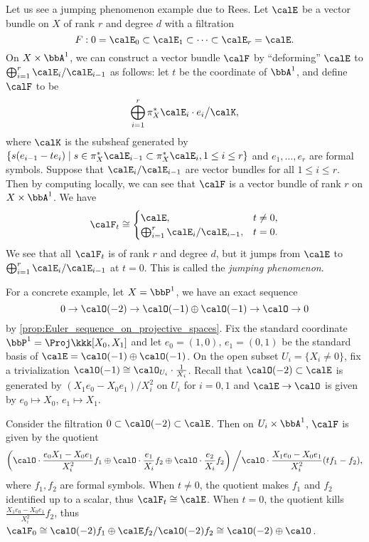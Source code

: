     Let us see a jumping phenomenon example due to Rees.
    Let \(\calE\) be a vector bundle on \(X\) of rank \(r\) and degree \(d\) with a filtration
    \[F: 0 = \calE_0 \subset \calE_1 \subset \cdots \subset \calE_r = \calE. \]
    On \(X \times \bbA^1\), we can construct a vector bundle \(\calF\) by ``deforming'' \(\calE\) to \(\bigoplus_{i=1}^r \calE_i/\calE_{i-1}\) as follows:
    let \(t\) be the coordinate of \(\bbA^1\), 
    and define \(\calF\) to be 
    \[ \bigoplus_{i=1}^r \pi_X^* \calE_i \cdot e_i \big/ \calK, \]
    where \(\calK\) is the subsheaf generated by \(\{s (e_{i-1} -te_i) \mid s \in \pi_X^* \calE_{i-1} \subset \pi_X^* \calE_i, 1 \leq i \leq r\}\) and \(e_1, \ldots, e_r\) are formal symbols.
    Suppose that \(\calE_i/\calE_{i-1}\) are vector bundles for all \(1 \leq i \leq r\).
    Then by computing locally, we can see that \(\calF\) is a vector bundle of rank \(r\) on \(X \times \bbA^1\).
    We have 
    \[ \calF_t \cong \begin{cases}
        \calE, & t \neq 0, \\
        \bigoplus_{i=1}^r \calE_i/\calE_{i-1}, & t = 0.
    \end{cases} \]
    We see that all \(\calF_t\) is of rank \(r\) and degree \(d\), but it jumps from \(\calE\) to \(\bigoplus_{i=1}^r \calE_i/\calE_{i-1}\) at \(t = 0\).
    This is called the \emph{jumping phenomenon}.

    \begin{example}\label{eg:Rees_construction_by_Euler_sequence_on_P1}
        For a concrete example, let \(X = \bbP^1\), we have an exact sequence
        \[ 0 \to \calO(-2) \to \calO(-1) \oplus \calO(-1) \to \calO \to 0 \]
        by \cref{prop:Euler_sequence_on_projective_spaces}.
        Fix the standard coordinate \(\bbP^1 = \Proj \kkk[X_0,X_1]\) and let \(e_0 = (1,0)\), \(e_1 = (0,1)\) be the standard basis of \(\calE = \calO(-1) \oplus \calO(-1)\).
        On the open subset \(U_i = \{X_i \neq 0\}\), fix a trivialization \(\calO(-1) \cong \calO_{U_i} \cdot \frac{1}{X_i}\).
        Recall that \(\calO(-2) \subset \calE\) is generated by \((X_1 e_0 - X_0 e_1)/X_i^2\) on \(U_i\) for \(i = 0,1\) and \(\calE \to \calO\) is given by \(e_0 \mapsto X_0\), \(e_1 \mapsto X_1\).

        Consider the filtration \(0 \subset \calO(-2) \subset \calE\).
        Then on \(U_i \times \bbA^1\), \(\calF\) is given by the quotient
        \[ \left(\calO \cdot \frac{e_0X_1 - X_0 e_1}{X_i^2} f_1 \oplus \calO \cdot \frac{e_1}{X_i} f_2 \oplus \calO \cdot \frac{e_2}{X_i} f_2 \right) \bigg/ \calO \cdot \frac{X_1 e_0 - X_0 e_1}{X_i^2} (t f_1 - f_2), \]
        where \(f_1, f_2\) are formal symbols.
        When \(t\neq 0\), the quotient makes \(f_1\) and \(f_2\) identified up to a scalar, thus \(\calF_t \cong \calE\).
        When \(t = 0\), the quotient kills \(\frac{X_1 e_0 - X_0 e_1}{X_i^2} f_2\), thus \(\calF_0 \cong \calO(-2)f_1 \oplus \calE f_2/\calO(-2)f_2 \cong \calO(-2) \oplus \calO\).
    \end{example}

